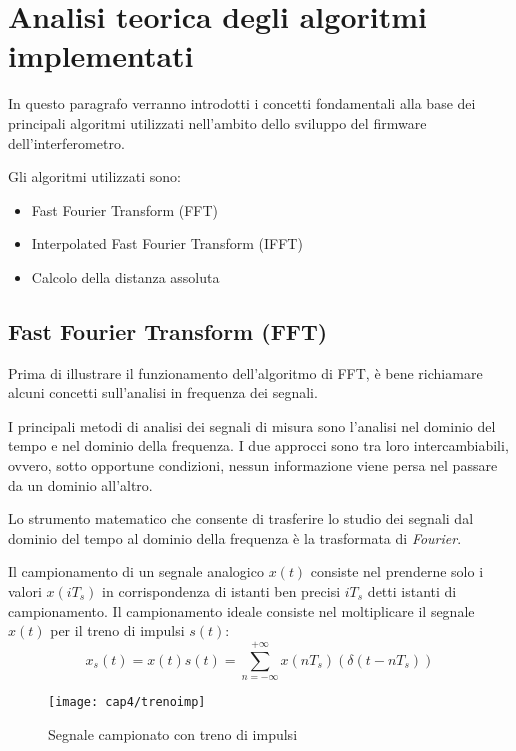 \section{Analisi teorica degli algoritmi implementati}
In questo paragrafo verranno introdotti i concetti fondamentali alla base dei principali algoritmi utilizzati nell'ambito dello sviluppo del firmware dell'interferometro.

Gli algoritmi utilizzati sono:
\begin{itemize}
	\item Fast Fourier Transform (FFT)
	\item Interpolated Fast Fourier Transform (IFFT)
	\item Calcolo della distanza assoluta
\end{itemize}

\subsection{Fast Fourier Transform (FFT)}
Prima di illustrare il funzionamento dell'algoritmo di FFT, è bene richiamare alcuni concetti sull'analisi in frequenza dei segnali.

I principali metodi di analisi dei segnali di misura sono l'analisi nel dominio del tempo e nel dominio della frequenza. I due approcci sono tra loro intercambiabili, ovvero, sotto opportune condizioni, nessun informazione viene persa nel passare da un dominio all'altro. 

Lo strumento matematico che consente di trasferire lo studio dei segnali dal dominio del tempo al dominio della frequenza è la trasformata di \textit{Fourier}.

Il campionamento di un segnale analogico $x(t)$ consiste nel prenderne solo i valori $x(iT_s)$ in corrispondenza di istanti ben precisi $iT_s$ detti istanti di campionamento. 
Il campionamento ideale consiste nel moltiplicare il segnale $x(t)$ per il treno di impulsi $s(t)$:
\begin{equation}
	x_s(t)=x(t) s(t) = \sum_{n=-\infty}^{+\infty} x(nT_s) (\delta (t-nT_s))
\end{equation}
\begin{figure}  
  \begin{center}
    \texttt{[image: cap4/trenoimp]}
    \caption{Segnale campionato con treno di impulsi}
  \end{center}
\end{figure}

